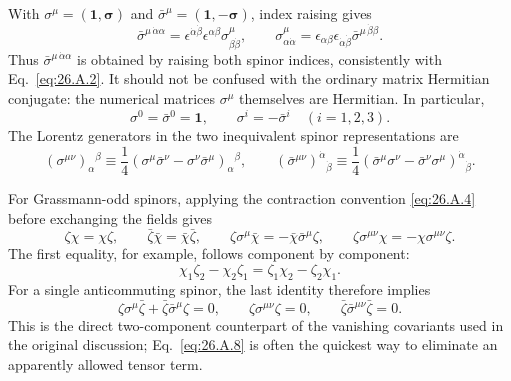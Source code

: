 With \(\sigma^\mu=(\mathbf{1},\boldsymbol{\sigma})\) and
\(\bar\sigma^\mu=(\mathbf{1},-\boldsymbol{\sigma})\), index raising gives
\begin{equation}
  \bar\sigma^{\mu\,\dot\alpha\alpha}
  =\epsilon^{\dot\alpha\dot\beta}\epsilon^{\alpha\beta}
    \sigma^\mu_{\beta\dot\beta},
  \qquad
  \sigma^\mu_{\alpha\dot\alpha}
  =\epsilon_{\alpha\beta}\epsilon_{\dot\alpha\dot\beta}
    \bar\sigma^{\mu\,\dot\beta\beta}.
  \tag{26.A.5}\label{eq:26.A.5}
\end{equation}
Thus \(\bar\sigma^{\mu\,\dot\alpha\alpha}\) is obtained by raising both
spinor indices, consistently with Eq.~\eqref{eq:26.A.2}.  It should not be
confused with the ordinary matrix
Hermitian conjugate: the numerical matrices \(\sigma^\mu\) themselves are
Hermitian.
In particular,
\[
  \sigma^0=\bar\sigma^0=\mathbf{1},
  \qquad
  \sigma^i=-\bar\sigma^i
  \quad(i=1,2,3).
\]
The Lorentz generators in the two inequivalent spinor representations are
\begin{equation}
  (\sigma^{\mu\nu})_\alpha{}^\beta
  \equiv\frac14
   (\sigma^\mu\bar\sigma^\nu-\sigma^\nu\bar\sigma^\mu)_\alpha{}^\beta,
  \qquad
  (\bar\sigma^{\mu\nu})^{\dot\alpha}{}_{\dot\beta}
  \equiv\frac14
   (\bar\sigma^\mu\sigma^\nu-\bar\sigma^\nu\sigma^\mu)
      ^{\dot\alpha}{}_{\dot\beta}.
  \tag{26.A.6}\label{eq:26.A.6}
\end{equation}

For Grassmann-odd spinors, applying the contraction convention
\eqref{eq:26.A.4} before exchanging the fields gives
\begin{equation}
  \zeta\chi=\chi\zeta,\qquad
  \bar\zeta\bar\chi=\bar\chi\bar\zeta,\qquad
  \zeta\sigma^\mu\bar\chi
  =-\bar\chi\bar\sigma^\mu\zeta,\qquad
  \zeta\sigma^{\mu\nu}\chi
  =-\chi\sigma^{\mu\nu}\zeta .
  \tag{26.A.7}\label{eq:26.A.7}
\end{equation}
The first equality, for example, follows component by component:
\[
  \chi_1\zeta_2-\chi_2\zeta_1
  =\zeta_1\chi_2-\zeta_2\chi_1 .
\]
For a single anticommuting spinor, the last identity therefore implies
\begin{equation}
  \zeta\sigma^\mu\bar\zeta
   +\bar\zeta\bar\sigma^\mu\zeta=0,
  \qquad
  \zeta\sigma^{\mu\nu}\zeta=0,
  \qquad
  \bar\zeta\bar\sigma^{\mu\nu}\bar\zeta=0 .
  \tag{26.A.8}\label{eq:26.A.8}
\end{equation}
This is the direct two-component counterpart of the vanishing covariants
used in the original discussion; Eq.~\eqref{eq:26.A.8} is often the
quickest way to eliminate an apparently allowed tensor term.

